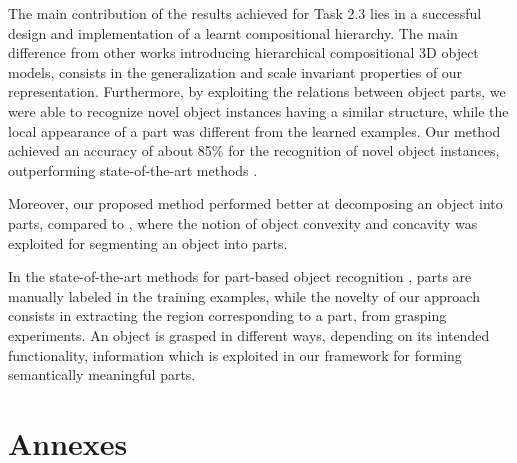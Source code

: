\documentclass[a4paper,11pt,pdf]{pacmanreport}
\begin{document}
The main contribution of the results achieved for Task 2.3 lies in a successful design and implementation of a learnt compositional hierarchy. The main 
difference from other works \cite{rel2,comp2} introducing hierarchical 
compositional 3D object models, consists in the generalization and scale 
invariant properties of our representation. 
Furthermore, by exploiting the relations between object parts, we were able to 
recognize novel object instances having a similar structure, while the local 
appearance of a part was different from the learned examples. Our method 
achieved an accuracy of about 85\% for the recognition of novel object instances, 
outperforming state-of-the-art methods \cite{vfh}. 

Moreover, our proposed method performed better at decomposing an object into 
parts, compared to \cite{rel7}, where the notion of object convexity and 
concavity was exploited for segmenting an object into parts.

In the state-of-the-art methods for part-based object recognition 
\cite{part2,part3,part1}, parts are manually labeled in the training examples, 
while the novelty of our approach consists in extracting the region 
corresponding to a part, from grasping experiments. An object is grasped in 
different ways, depending on its intended functionality, information which is 
exploited in our framework for forming semantically meaningful parts.

\newpage




\newpage

\appendix

\section{Annexes}

\end{document}
